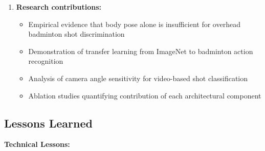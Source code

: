 \documentclass[11pt,a4paper]{article}
\begin{document}
\begin{enumerate}
\item \textbf{Research contributions:}
   \begin{itemize}
   \item Empirical evidence that body pose alone is insufficient for overhead badminton shot discrimination
   \item Demonstration of transfer learning from ImageNet to badminton action recognition
   \item Analysis of camera angle sensitivity for video-based shot classification
   \item Ablation studies quantifying contribution of each architectural component
   \end{itemize}
\end{enumerate}

\subsection{Lessons Learned}

\textbf{Technical Lessons:}
\end{document}
